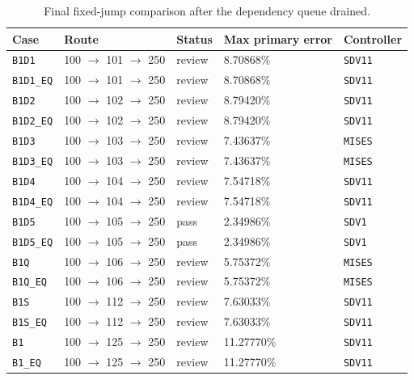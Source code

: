 \documentclass[11pt,a4paper]{article}
\newcommand{\code}[1]{\texttt{#1}}
\begin{document}
\begin{table}[H]
\centering
\caption{Final fixed-jump comparison after the dependency queue drained.}
\begin{tabular}{lllll}
\toprule
Case & Route & Status & Max primary error & Controller \\
\midrule
\code{B1D1} & 100 $\rightarrow$ 101 $\rightarrow$ 250 & review & 8.70868\% & \code{SDV11} \\
\code{B1D1\_EQ} & 100 $\rightarrow$ 101 $\rightarrow$ 250 & review & 8.70868\% & \code{SDV11} \\
\code{B1D2} & 100 $\rightarrow$ 102 $\rightarrow$ 250 & review & 8.79420\% & \code{SDV11} \\
\code{B1D2\_EQ} & 100 $\rightarrow$ 102 $\rightarrow$ 250 & review & 8.79420\% & \code{SDV11} \\
\code{B1D3} & 100 $\rightarrow$ 103 $\rightarrow$ 250 & review & 7.43637\% & \code{MISES} \\
\code{B1D3\_EQ} & 100 $\rightarrow$ 103 $\rightarrow$ 250 & review & 7.43637\% & \code{MISES} \\
\code{B1D4} & 100 $\rightarrow$ 104 $\rightarrow$ 250 & review & 7.54718\% & \code{SDV11} \\
\code{B1D4\_EQ} & 100 $\rightarrow$ 104 $\rightarrow$ 250 & review & 7.54718\% & \code{SDV11} \\
\code{B1D5} & 100 $\rightarrow$ 105 $\rightarrow$ 250 & pass & 2.34986\% & \code{SDV1} \\
\code{B1D5\_EQ} & 100 $\rightarrow$ 105 $\rightarrow$ 250 & pass & 2.34986\% & \code{SDV1} \\
\code{B1Q} & 100 $\rightarrow$ 106 $\rightarrow$ 250 & review & 5.75372\% & \code{MISES} \\
\code{B1Q\_EQ} & 100 $\rightarrow$ 106 $\rightarrow$ 250 & review & 5.75372\% & \code{MISES} \\
\code{B1S} & 100 $\rightarrow$ 112 $\rightarrow$ 250 & review & 7.63033\% & \code{SDV11} \\
\code{B1S\_EQ} & 100 $\rightarrow$ 112 $\rightarrow$ 250 & review & 7.63033\% & \code{SDV11} \\
\code{B1} & 100 $\rightarrow$ 125 $\rightarrow$ 250 & review & 11.27770\% & \code{SDV11} \\
\code{B1\_EQ} & 100 $\rightarrow$ 125 $\rightarrow$ 250 & review & 11.27770\% & \code{SDV11} \\
\bottomrule
\end{tabular}
\end{table}
\end{document}
